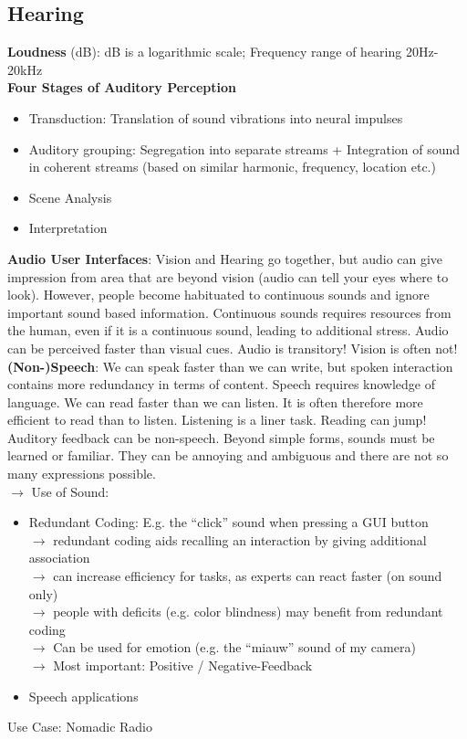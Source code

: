 \subsection{Hearing}
\textbf{Loudness} (dB): dB is a logarithmic scale; Frequency range of hearing 20Hz-20kHz\\
\textbf{Four Stages of Auditory Perception}
\begin{itemize}
\item Transduction: Translation of sound vibrations into neural impulses
\item Auditory grouping: Segregation into separate streams + Integration of sound in coherent streams (based on similar harmonic, frequency, location etc.)
\item Scene Analysis
\item Interpretation
\end{itemize}
\textbf{Audio User Interfaces}: Vision and Hearing go together, but audio can give impression from area that are beyond vision (audio can tell your eyes where to look). However, people become habituated to continuous sounds and ignore important sound based information. Continuous sounds requires resources from the human, even if it is a continuous sound, leading to additional stress. Audio can be perceived faster than visual cues. Audio is transitory! Vision is often not!\\
\textbf{(Non-)Speech}: We can speak faster than we can write, but spoken interaction contains more redundancy in terms of content. Speech requires knowledge of language. We can read faster than we can listen. It is often therefore more efficient to read than to listen. Listening is a liner task. Reading can jump! Auditory feedback can be non-speech. Beyond simple forms, sounds must be learned or familiar. They can be annoying and ambiguous and there are not so many expressions possible.\\
$\rightarrow$ Use of Sound:
\begin{itemize}
\item Redundant Coding: E.g. the ``click'' sound when pressing a GUI button\\
$\rightarrow$ redundant coding aids recalling an interaction by giving additional association\\
$\rightarrow$ can increase efficiency for tasks, as experts can react faster (on sound only)\\
$\rightarrow$ people with deficits (e.g. color blindness) may benefit from redundant coding\\
$\rightarrow$ Can be used for emotion (e.g. the ``miauw'' sound of my camera)\\
$\rightarrow$ Most important: Positive / Negative-Feedback\\
\item Speech applications
\end{itemize}
Use Case: Nomadic Radio	